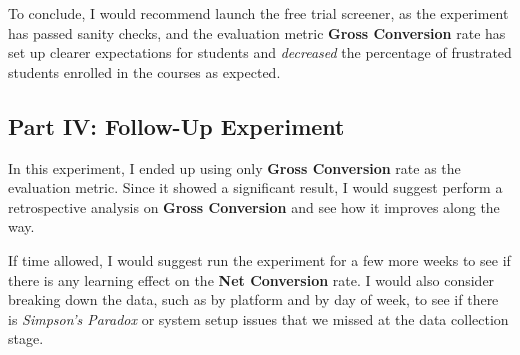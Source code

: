 \documentclass[11pt]{article}
\begin{document}
To conclude, I would recommend launch the free trial screener, as the
experiment has passed sanity checks, and the evaluation metric
\textbf{Gross Conversion} rate has set up clearer expectations for
students and \emph{decreased} the percentage of frustrated students
enrolled in the courses as expected.

    \subsection{Part IV: Follow-Up
Experiment}\label{part-iv-follow-up-experiment}

In this experiment, I ended up using only \textbf{Gross Conversion} rate
as the evaluation metric. Since it showed a significant result, I would
suggest perform a retrospective analysis on \textbf{Gross Conversion}
and see how it improves along the way.

If time allowed, I would suggest run the experiment for a few more weeks
to see if there is any learning effect on the \textbf{Net Conversion}
rate. I would also consider breaking down the data, such as by platform
and by day of week, to see if there is \emph{Simpson's Paradox} or
system setup issues that we missed at the data collection stage.


    
    
    
    
\end{document}
